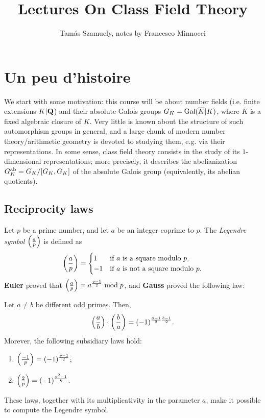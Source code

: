 \documentclass{article}
\title{Lectures On Class Field Theory}
\author{Tamás Szamuely, notes by Francesco Minnocci}
\date{}
\begin{document}
\maketitle

\tableofcontents

\newpage

\section{Un peu d'histoire}
We start with some motivation: this course will be about number fields (i.e. finite extensions $K|\mathbf{Q}$) and their absolute Galois groups $G_K = \operatorname{Gal}(\overline{K}|K)$, where $\overline{K}$ is a fixed algebraic closure of $K$. Very little is known about the structure of such automorphism groups in general, and a large chunk of modern number theory/arithmetic geometry is devoted to studying them, e.g. via their representations. In some sense, class field theory consists in the study of its $1$-dimensional representations; more precisely, it describes the abelianization $G_K^{\text{ab}} = G_K/[G_K,G_K]$ of the absolute Galois group (equivalently, its abelian quotients).

\subsection{Reciprocity laws}
Let $p$ be a prime number, and let $a$ be an integer coprime to $p$. The \emph{Legendre symbol} $\left(\frac{a}{p}\right)$ is defined as
\[
	\left(\frac{a}{p}\right) = \begin{cases}
		1  & \text{if $a$ is a square modulo $p$},     \\
		-1 & \text{if $a$ is not a square modulo $p$}.
	\end{cases}
\]
\textbf{Euler} proved that $\left(\frac{a}{p}\right) = a^{\frac{p-1}{2}} \bmod p$, and \textbf{Gauss} proved the following law:
\begin{thm}
	Let $a\ne b$ be different odd primes. Then,
	\[
		\left(\frac{a}{b}\right)\cdot\left(\frac{b}{a}\right) = (-1)^{\frac{a-1}{2}\frac{b-1}{2}}.
	\]
	Morever, the following subsidiary laws hold:
	\begin{enumerate}
		\item $\left(\frac{-1}{p}\right) = (-1)^{\frac{p-1}{2}}$;
		\item $\left(\frac{2}{p}\right) = (-1)^{\frac{p^2-1}{8}}$.
	\end{enumerate}
\end{thm}
These laws, together with its multiplicativity in the parameter $a$, make it possible to compute the Legendre symbol.
\end{document}
